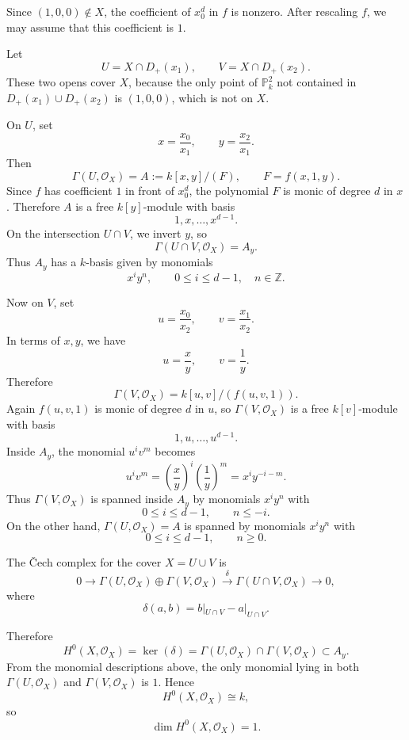 \documentclass[12pt]{article}
\begin{document}
\begin{solution}
    Since $(1,0,0)\notin X$, the coefficient of $x_0^d$ in $f$ is nonzero. After rescaling $f$, we may assume that this coefficient is $1$.

    Let
    \[
        U=X\cap D_+(x_1),
        \qquad
        V=X\cap D_+(x_2).
    \]
    These two opens cover $X$, because the only point of $\mathbb P^2_k$ not contained in $D_+(x_1)\cup D_+(x_2)$ is $(1,0,0)$, which is not on $X$.

    On $U$, set
    \[
        x=\frac{x_0}{x_1},
        \qquad
        y=\frac{x_2}{x_1}.
    \]
    Then
    \[
        \Gamma(U,\mathcal O_X)=A:=k[x,y]/(F),
        \qquad
        F=f(x,1,y).
    \]
    Since $f$ has coefficient $1$ in front of $x_0^d$, the polynomial $F$ is monic of degree $d$ in $x$. Therefore $A$ is a free $k[y]$-module with basis
    \[
        1,x,\dots,x^{d-1}.
    \]
    On the intersection $U\cap V$, we invert $y$, so
    \[
        \Gamma(U\cap V,\mathcal O_X)=A_y.
    \]
    Thus $A_y$ has a $k$-basis given by monomials
    \[
        x^i y^n,
        \qquad
        0\le i\le d-1,\quad n\in \mathbb Z.
    \]

    Now on $V$, set
    \[
        u=\frac{x_0}{x_2},
        \qquad
        v=\frac{x_1}{x_2}.
    \]
    In terms of $x,y$, we have
    \[
        u=\frac{x}{y},
        \qquad
        v=\frac{1}{y}.
    \]
    Therefore
    \[
        \Gamma(V,\mathcal O_X)
        =
        k[u,v]/(f(u,v,1)).
    \]
    Again $f(u,v,1)$ is monic of degree $d$ in $u$, so $\Gamma(V,\mathcal O_X)$ is a free $k[v]$-module with basis
    \[
        1,u,\dots,u^{d-1}.
    \]
    Inside $A_y$, the monomial $u^i v^m$ becomes
    \[
        u^i v^m
        =
        \left(\frac{x}{y}\right)^i
        \left(\frac{1}{y}\right)^m
        =
        x^i y^{-i-m}.
    \]
    Thus $\Gamma(V,\mathcal O_X)$ is spanned inside $A_y$ by monomials $x^i y^n$
    with
    \[
        0\le i\le d-1,
        \qquad
        n\le -i.
    \]
    On the other hand, $\Gamma(U,\mathcal O_X)=A$ is spanned by monomials $x^i y^n$
    with
    \[
        0\le i\le d-1,
        \qquad
        n\ge 0.
    \]

    The \v Cech complex for the cover $X=U\cup V$ is
    \[
        0\to
        \Gamma(U,\mathcal O_X)\oplus \Gamma(V,\mathcal O_X)
        \xrightarrow{\delta}
        \Gamma(U\cap V,\mathcal O_X)
        \to 0,
    \]
    where
    \[
        \delta(a,b)=b|_{U\cap V}-a|_{U\cap V}.
    \]

    Therefore
    \[
        H^0(X,\mathcal O_X)
        =
        \ker(\delta)
        =
        \Gamma(U,\mathcal O_X)\cap \Gamma(V,\mathcal O_X)
        \subset A_y.
    \]
    From the monomial descriptions above, the only monomial lying in both $\Gamma(U,\mathcal O_X)$ and $\Gamma(V,\mathcal O_X)$ is $1$. Hence
    \[
        H^0(X,\mathcal O_X)\cong k,
    \]
    so
    \[
        \dim H^0(X,\mathcal O_X)=1.
    \]


\end{solution}
\end{document}
